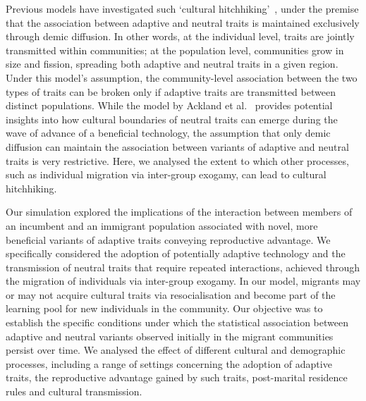 \documentclass[9pt,twocolumn,twoside,lineno]{pnas-new}
\begin{document}
Previous models have investigated such `cultural hitchhiking'~\citep{ackland_cultural_2007}, under the premise that the association between adaptive and neutral traits is maintained exclusively through demic diffusion.
In other words, at the individual level, traits are jointly transmitted within communities; at the population level, communities grow in size and fission, spreading both adaptive and neutral traits in a given region.
Under this model's assumption, the community-level association between the two types of traits can be broken only if adaptive traits are transmitted between distinct populations.
While the model by Ackland et al.~\citep{ackland_cultural_2007} provides potential insights into how cultural boundaries of neutral traits can emerge during the wave of advance of a beneficial technology, the assumption that only demic diffusion can maintain the association between variants of adaptive and neutral traits is very restrictive. 
Here, we analysed the extent to which other processes, such as individual migration via inter-group exogamy, can lead to cultural hitchhiking. 

Our simulation explored the implications of the interaction between members of an incumbent and an immigrant population associated with novel, more beneficial variants of adaptive traits conveying reproductive advantage. 
We specifically considered the adoption of potentially adaptive technology and the transmission of neutral traits that require repeated interactions, achieved through the migration of individuals via inter-group exogamy. 
In our model, migrants may or may not acquire cultural traits via resocialisation and become part of the learning pool for new individuals in the community. 
Our objective was to establish the specific conditions under which the statistical association between adaptive and neutral variants observed initially in the migrant communities persist over time.
We analysed the effect of different cultural and demographic processes, including a range of settings concerning the adoption of adaptive traits, the reproductive advantage gained by such traits, post-marital residence rules and cultural transmission.
\end{document}
